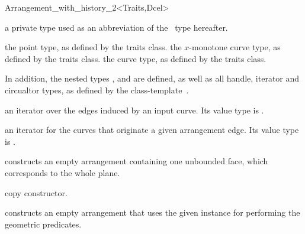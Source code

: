 \begin{ccRefClass}{Arrangement_with_history_2<Traits,Dcel>}
\ccInheritsFrom{}


\ccTypes

  {a private type used as an abbreviation of the \ccRefName\ type hereafter.}
  
\ccGlue
{}

  {the point type, as defined by the traits class.}
\ccGlue
{}
  {the $x$-monotone curve type, as defined by the traits class.}
\ccGlue
{}
  {the curve type, as defined by the traits class.}

In addition, the nested types ,  and 
are defined, as well as all handle, iterator and circualtor types, as
defined by the 
class-template~.

\ccGlue
{}

       {an iterator over the edges induced by an input curve.
        Its value type is .}

    {an iterator for the curves that originate a given arrangement edge.
     Its value type is .}

\ccCreation
{}
    
    {constructs an empty arrangement containing one unbounded face,
     which corresponds to the
     whole plane.}
    
    {copy constructor.}
        
    {constructs an empty arrangement that uses the given 
     instance for performing the geometric predicates.}



\end{ccRefClass}
